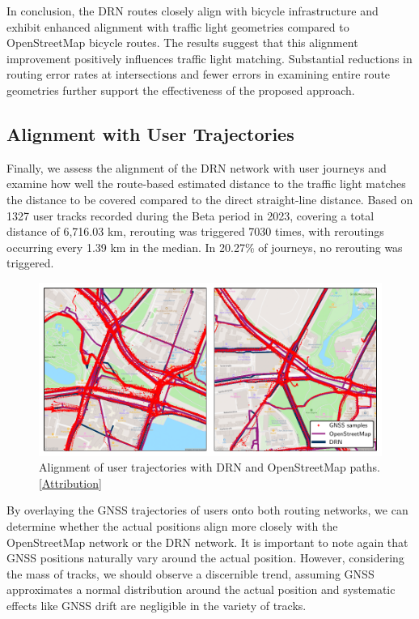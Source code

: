 In conclusion, the DRN routes closely align with bicycle infrastructure and exhibit enhanced alignment with traffic light geometries compared to OpenStreetMap bicycle routes. The results suggest that this alignment improvement positively influences traffic light matching. Substantial reductions in routing error rates at intersections and fewer errors in examining entire route geometries further support the effectiveness of the proposed approach.

\subsection{Alignment with User Trajectories}

Finally, we assess the alignment of the DRN network with user journeys and examine how well the route-based estimated distance to the traffic light matches the distance to be covered compared to the direct straight-line distance. Based on 1327 user tracks recorded during the Beta period in 2023, covering a total distance of 6,716.03 km, rerouting was triggered 7030 times, with reroutings occurring every 1.39 km in the median. In 20.27\% of journeys, no rerouting was triggered.

\begin{figure}[t]
\centering 
\includegraphics[width=\linewidth]{images/routing-mapmatching-distance.pdf}
\caption{Alignment of user trajectories with DRN and OpenStreetMap paths. [\hyperref[attribution]{Attribution}]}
\label{fig:routing-mapmatching-distance}
\end{figure}

By overlaying the GNSS trajectories of users onto both routing networks, we can determine whether the actual positions align more closely with the OpenStreetMap network or the DRN network. It is important to note again that GNSS positions naturally vary around the actual position. However, considering the mass of tracks, we should observe a discernible trend, assuming GNSS approximates a normal distribution around the actual position and systematic effects like GNSS drift are negligible in the variety of tracks.

